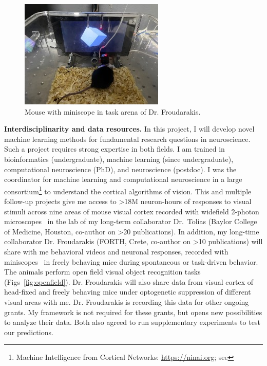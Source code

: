 \documentclass[COG,11pt]{ercgrant}
\begin{document}
\begin{figure}
\vspace{-1.8ex}
\includegraphics[width=\linewidth,trim=25 15 10 30, clip]{figures/miniscope.jpg}
\caption{Mouse with miniscope in task arena of Dr. Froudarakis.}
\label{fig:miniscope}
\end{figure}
\textbf{Interdisciplinarity and data resources.} In this project, I will develop novel machine learning methods for fundamental research questions in neuroscience. Such a project requires strong expertise in both fields. 
I am trained in bioinformatics (undergraduate), machine learning (since undergraduate), computational neuroscience (PhD), and neuroscience (postdoc). 
I was the coordinator for machine learning and computational neuroscience in a large consortium\footnote{Machine Intelligence from Cortical Networks: \url{https://ninai.org}; see } to understand the cortical algorithms of vision.
This and multiple follow-up projects give me access to >18M neuron-hours of responses to visual stimuli across nine areas of mouse visual cortex recorded with widefield 2-photon microscopes~\parencite{Sofroniew2016-xg} in the lab of my long-term collaborator Dr.~Tolias (Baylor College of Medicine, Houston, co-author on >20  publications). In addition, my long-time collaborator Dr. Froudarakis (FORTH, Crete, co-author on >10 publications) 
will share with me behavioral videos and neuronal responses, recorded with miniscopes~\parencite[Fig~\ref{fig:miniscope}]{Cai2016-rh} in freely behaving mice during spontaneous or task-driven behavior.
The animals perform open field visual object recognition tasks (Figs~\ref{fig:openfield}). Dr. Froudarakis will also share data from visual cortex of head-fixed and freely behaving mice under optogenetic suppression of different visual areas with me. Dr. Froudarakis is recording this data for other ongoing grants. My framework is not required for these grants, but opens new possibilities to analyze their data.
Both also agreed to run supplementary experiments to test our predictions.
\end{document}
